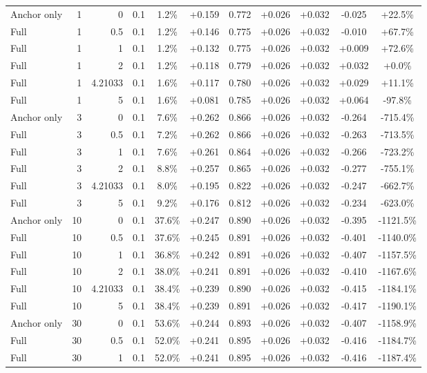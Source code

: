 \begin{table}[htbp]
\begin{tabular}{lrrrccccccc}
Anchor only & 1 & 0 & 0.1 & 1.2\% & +0.159 & 0.772 & +0.026 & +0.032 & -0.025 & +22.5\% \\
Full & 1 & 0.5 & 0.1 & 1.2\% & +0.146 & 0.775 & +0.026 & +0.032 & -0.010 & +67.7\% \\
Full & 1 & 1 & 0.1 & 1.2\% & +0.132 & 0.775 & +0.026 & +0.032 & +0.009 & +72.6\% \\
Full & 1 & 2 & 0.1 & 1.2\% & +0.118 & 0.779 & +0.026 & +0.032 & +0.032 & +0.0\% \\
Full & 1 & 4.21033 & 0.1 & 1.6\% & +0.117 & 0.780 & +0.026 & +0.032 & +0.029 & +11.1\% \\
Full & 1 & 5 & 0.1 & 1.6\% & +0.081 & 0.785 & +0.026 & +0.032 & +0.064 & -97.8\% \\
Anchor only & 3 & 0 & 0.1 & 7.6\% & +0.262 & 0.866 & +0.026 & +0.032 & -0.264 & -715.4\% \\
Full & 3 & 0.5 & 0.1 & 7.2\% & +0.262 & 0.866 & +0.026 & +0.032 & -0.263 & -713.5\% \\
Full & 3 & 1 & 0.1 & 7.6\% & +0.261 & 0.864 & +0.026 & +0.032 & -0.266 & -723.2\% \\
Full & 3 & 2 & 0.1 & 8.8\% & +0.257 & 0.865 & +0.026 & +0.032 & -0.277 & -755.1\% \\
Full & 3 & 4.21033 & 0.1 & 8.0\% & +0.195 & 0.822 & +0.026 & +0.032 & -0.247 & -662.7\% \\
Full & 3 & 5 & 0.1 & 9.2\% & +0.176 & 0.812 & +0.026 & +0.032 & -0.234 & -623.0\% \\
Anchor only & 10 & 0 & 0.1 & 37.6\% & +0.247 & 0.890 & +0.026 & +0.032 & -0.395 & -1121.5\% \\
Full & 10 & 0.5 & 0.1 & 37.6\% & +0.245 & 0.891 & +0.026 & +0.032 & -0.401 & -1140.0\% \\
Full & 10 & 1 & 0.1 & 36.8\% & +0.242 & 0.891 & +0.026 & +0.032 & -0.407 & -1157.5\% \\
Full & 10 & 2 & 0.1 & 38.0\% & +0.241 & 0.891 & +0.026 & +0.032 & -0.410 & -1167.6\% \\
Full & 10 & 4.21033 & 0.1 & 38.4\% & +0.239 & 0.890 & +0.026 & +0.032 & -0.415 & -1184.1\% \\
Full & 10 & 5 & 0.1 & 38.4\% & +0.239 & 0.891 & +0.026 & +0.032 & -0.417 & -1190.1\% \\
Anchor only & 30 & 0 & 0.1 & 53.6\% & +0.244 & 0.893 & +0.026 & +0.032 & -0.407 & -1158.9\% \\
Full & 30 & 0.5 & 0.1 & 52.0\% & +0.241 & 0.895 & +0.026 & +0.032 & -0.416 & -1184.7\% \\
Full & 30 & 1 & 0.1 & 52.0\% & +0.241 & 0.895 & +0.026 & +0.032 & -0.416 & -1187.4\% \\

\end{tabular}
\end{table}
